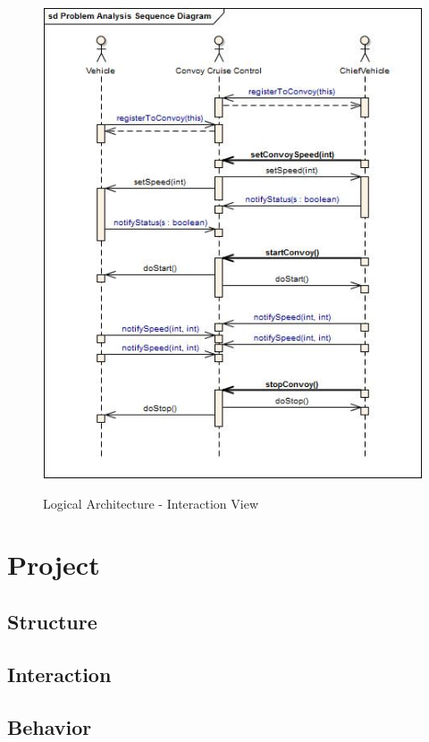 \documentclass{llncs}
\newcommand{\labelsec}[1]{\label{sec:#1}}
\newcommand{\labelfig}[1]{\label{fig:#1}}
\begin{document}
\begin{figure}
   \centering
   \includegraphics[scale = 0.6]{../Diagrams/Problem_Analysis_Sequence_Diagram.jpg}\\
  \caption{Logical Architecture - Interaction View}\labelfig{testTypes}
\end{figure}

\section{Project}
\labelsec{Project}

\subsection{Structure}
\subsection{Interaction}
\subsection{Behavior}
\end{document}
